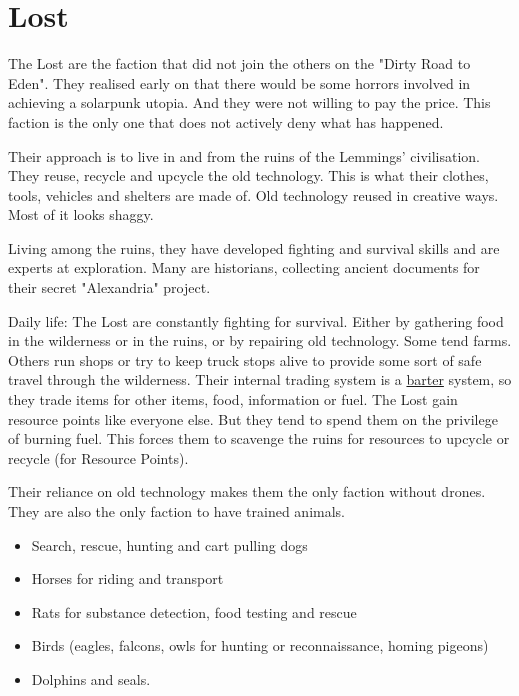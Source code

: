 \section{Lost}
\label{sec:Lost}

The Lost are the faction that did not join the others on the "Dirty Road to Eden". They realised early on that there would be some horrors involved in achieving a solarpunk utopia. And they were not willing to pay the price. This faction is the only one that does not actively deny what has happened.

Their approach is to live in and from the ruins of the Lemmings' civilisation. They reuse, recycle and upcycle the old technology. This is what their clothes, tools, vehicles and shelters are made of. Old technology reused in creative ways. Most of it looks shaggy.

Living among the ruins, they have developed fighting and survival skills and are experts at exploration.
Many are historians, collecting ancient documents for their secret "Alexandria" project.

Daily life: The Lost are constantly fighting for survival. Either by gathering food in the wilderness or in the ruins, or by repairing old technology. Some tend farms. Others run shops or try to keep truck stops alive to provide some sort of safe travel through the wilderness. Their internal trading system is a \hyperref[sec:Barter]{barter} system, so they trade items for other items, food, information or fuel.
The Lost gain resource points like everyone else. But they tend to spend them on the privilege of burning fuel. This forces them to scavenge the ruins for resources to upcycle or recycle (for Resource Points).

Their reliance on old technology makes them the only faction without drones. They are also the only faction to have trained animals.

\begin{itemize}
    \item Search, rescue, hunting and cart pulling dogs
    \item Horses for riding and transport
    \item Rats for substance detection, food testing and rescue
    \item Birds (eagles, falcons, owls for hunting or reconnaissance, homing pigeons)
    \item Dolphins and seals.
\end{itemize}

